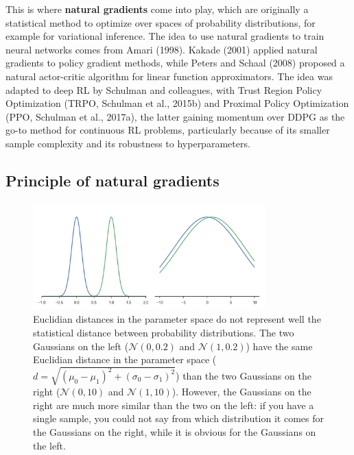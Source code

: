 \documentclass[
  letterpaper,
  DIV=11,
  numbers=noendperiod]{scrreprt}
\begin{document}
This is where \textbf{natural gradients} come into play, which are
originally a statistical method to optimize over spaces of probability
distributions, for example for variational inference. The idea to use
natural gradients to train neural networks comes from Amari (1998).
Kakade (2001) applied natural gradients to policy gradient methods,
while Peters and Schaal (2008) proposed a natural actor-critic algorithm
for linear function approximators. The idea was adapted to deep RL by
Schulman and colleagues, with Trust Region Policy Optimization (TRPO,
Schulman et al., 2015b) and Proximal Policy Optimization (PPO, Schulman
et al., 2017a), the latter gaining momentum over DDPG as the go-to
method for continuous RL problems, particularly because of its smaller
sample complexity and its robustness to hyperparameters.

\hypertarget{principle-of-natural-gradients}{%
\subsection{Principle of natural
gradients}\label{principle-of-natural-gradients}}

\begin{figure}

{\centering \includegraphics[width=0.8\textwidth,height=\textheight]{./img/naturalgradient.png}

}

\caption{\label{fig-naturalgradient}Euclidian distances in the parameter
space do not represent well the statistical distance between probability
distributions. The two Gaussians on the left (\(\mathcal{N}(0, 0.2)\)
and \(\mathcal{N}(1, 0.2)\)) have the same Euclidian distance in the
parameter space
(\(d = \sqrt{(\mu_0 - \mu_1)^2+(\sigma_0 - \sigma_1)^2}\)) than the two
Gaussians on the right (\(\mathcal{N}(0, 10)\) and
\(\mathcal{N}(1, 10)\)). However, the Gaussians on the right are much
more similar than the two on the left: if you have a single sample, you
could not say from which distribution it comes for the Gaussians on the
right, while it is obvious for the Gaussians on the left.}

\end{figure}
\end{document}

